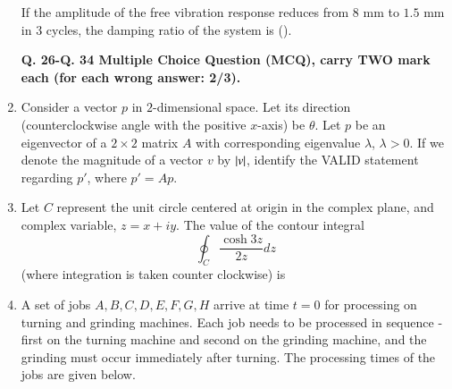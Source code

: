 \documentclass[journal]{IEEEtran}
\begin{document}
\begin{enumerate}
If the amplitude of the free vibration response reduces from $8$ mm to $1.5$ mm in $3$ cycles, the damping ratio of the system is \underline{\hspace{2cm}} ().

\hfill{}
\textbf{Q. 26-Q. 34 Multiple Choice Question (MCQ), carry TWO mark each (for each wrong answer: 2/3).}
\item Consider a vector $p$ in $2$-dimensional space. Let its direction (counterclockwise angle with the positive $x$-axis) be $\theta$. Let $p$ be an eigenvector of a $2 \times 2$ matrix $A$ with corresponding eigenvalue $\lambda$, $\lambda>0$. If we denote the magnitude of a vector $v$ by $\left\vert v\right\vert$, identify the VALID statement regarding $p'$, where $p' = Ap$.

\begin{enumerate}
\end{enumerate}

\hfill{}

\item Let $C$ represent the unit circle centered at origin in the complex plane, and complex variable, $z = x + iy$. The value of the contour integral
\[
\oint_C \frac{\cosh 3z}{2z} dz
\]
(where integration is taken counter clockwise) is

\begin{enumerate}
\end{enumerate}

\hfill{}


\item A set of jobs $A, B, C, D, E, F, G, H$ arrive at time $t=0$ for processing on turning and grinding machines. Each job needs to be processed in sequence - first on the turning machine and second on the grinding machine, and the grinding must occur immediately after turning. The processing times of the jobs are given below.



\end{enumerate}
\end{document}
